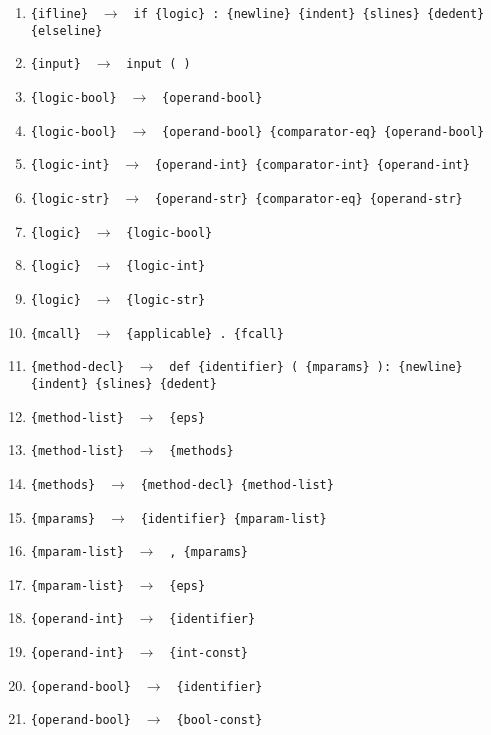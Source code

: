 \documentclass[a4paper,10pt,notitlepage,pdftex]{scrreprt}
\begin{document}
\begin{enumerate}
                \item \verb'{ifline} ' $\rightarrow$ \verb' if {logic} : {newline} {indent} {slines} {dedent} {elseline}'
                \item \verb'{input} ' $\rightarrow$ \verb' input ( )'
                \item \verb'{logic-bool} ' $\rightarrow$ \verb' {operand-bool}'
                \item \verb'{logic-bool} ' $\rightarrow$ \verb' {operand-bool} {comparator-eq} {operand-bool}'
                \item \verb'{logic-int} ' $\rightarrow$ \verb' {operand-int} {comparator-int} {operand-int}'
                \item \verb'{logic-str} ' $\rightarrow$ \verb' {operand-str} {comparator-eq} {operand-str}'
                \item \verb'{logic} ' $\rightarrow$ \verb' {logic-bool}'
                \item \verb'{logic} ' $\rightarrow$ \verb' {logic-int}'
                \item \verb'{logic} ' $\rightarrow$ \verb' {logic-str}'
                \item \verb'{mcall} ' $\rightarrow$ \verb' {applicable} . {fcall}'
                \item \verb'{method-decl} ' $\rightarrow$ \verb' def {identifier} ( {mparams} ): {newline} {indent} {slines} {dedent}'
                \item \verb'{method-list} ' $\rightarrow$ \verb' {eps}'
                \item \verb'{method-list} ' $\rightarrow$ \verb' {methods}'
                \item \verb'{methods} ' $\rightarrow$ \verb' {method-decl} {method-list}'
                \item \verb'{mparams} ' $\rightarrow$ \verb' {identifier} {mparam-list}'
                \item \verb'{mparam-list} ' $\rightarrow$ \verb' , {mparams}'
                \item \verb'{mparam-list} ' $\rightarrow$ \verb' {eps}'
                \item \verb'{operand-int} ' $\rightarrow$ \verb' {identifier}'
                \item \verb'{operand-int} ' $\rightarrow$ \verb' {int-const}'
                \item \verb'{operand-bool} ' $\rightarrow$ \verb' {identifier}'
                \item \verb'{operand-bool} ' $\rightarrow$ \verb' {bool-const}'

\end{enumerate}
\end{document}
